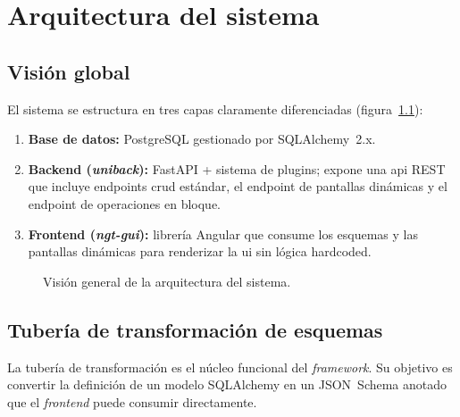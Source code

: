 \chapter{Arquitectura del sistema}
\label{ch:arquitectura}

\section{Visión global}
\label{sec:vision-global}

El sistema se estructura en tres capas claramente diferenciadas
(figura~\ref{fig:arch-overview}):

\begin{enumerate}
  \item \textbf{Base de datos:} PostgreSQL gestionado por SQLAlchemy~2.x.
  \item \textbf{Backend (\textit{uniback}):} FastAPI + sistema de plugins; expone una
    \gls{api} REST que incluye endpoints \gls{crud} estándar, el endpoint de pantallas
    dinámicas y el endpoint de operaciones en bloque.
  \item \textbf{Frontend (\textit{ngt-gui}):} librería Angular que consume los esquemas
    y las pantallas dinámicas para renderizar la \gls{ui} sin lógica hardcoded.
\end{enumerate}

\begin{figure}[H]
  \centering
  \caption{Visión general de la arquitectura del sistema.}
  \label{fig:arch-overview}
\end{figure}

\section{Tubería de transformación de esquemas}
\label{sec:pipeline}

La tubería de transformación es el núcleo funcional del \textit{framework}. Su objetivo es
convertir la definición de un modelo SQLAlchemy en un JSON~Schema anotado que el
\textit{frontend} puede consumir directamente.

